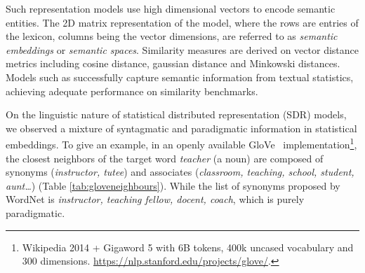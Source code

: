 Such representation models use high dimensional vectors to encode semantic entities. The 2D matrix representation of the model, where the rows are entries of the lexicon, columns being the vector dimensions, are referred to as \emph{semantic embeddings} or \emph{semantic spaces}. Similarity measures are derived on vector distance metrics including cosine distance, gaussian distance and Minkowski distances. Models such as \textcite{penningtonGloveGlobalVectors2014, mikolovEfficientEstimationWord2013} successfully capture semantic information from textual statistics, achieving adequate performance on similarity benchmarks. 

On the linguistic nature of statistical distributed representation (SDR) models, we observed a mixture of syntagmatic and paradigmatic information in statistical embeddings. To give an example, in an openly available GloVe~\parencite{penningtonGloveGlobalVectors2014} implementation\footnote{Wikipedia 2014 + Gigaword 5 with 6B tokens, 400k uncased vocabulary and 300 dimensions. \url{https://nlp.stanford.edu/projects/glove/}.}, the closest neighbors of the target word \emph{teacher} (a noun) are composed of synonyms (\emph{instructor, tutee}) and associates (\emph{classroom, teaching, school, student, aunt\dots}) (Table \ref{tab:gloveneighbours}).  While the list of synonyms proposed by WordNet is \emph{instructor, teaching fellow, docent, coach}, which is purely paradigmatic.


